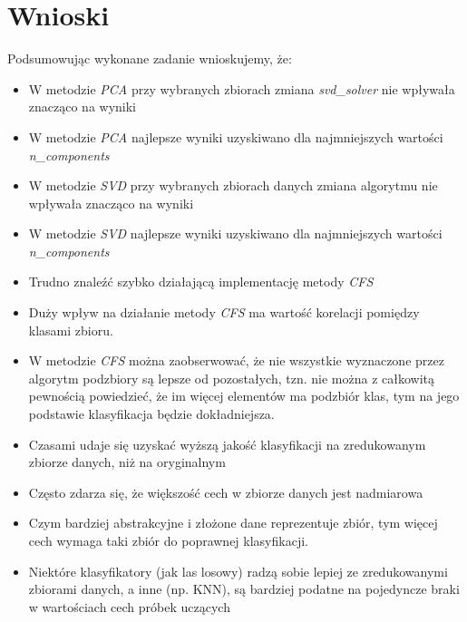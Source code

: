 \documentclass{classrep}
\begin{document}
    \section{Wnioski}
    \label{conclusions} {
        Podsumowując wykonane zadanie wnioskujemy, że:
        \begin{itemize}
            \item W metodzie \textit{PCA} przy wybranych zbiorach zmiana
            \textit{svd\_solver} nie wpływała znacząco na wyniki
            \item W metodzie \textit{PCA} najlepsze wyniki uzyskiwano dla najmniejszych
            wartości \textit{n\_components}
            \item W metodzie \textit{SVD} przy wybranych zbiorach danych zmiana
            algorytmu nie wpływała znacząco na wyniki
            \item W metodzie \textit{SVD} najlepsze wyniki uzyskiwano dla najmniejszych
            wartości \textit{n\_components}
            \item Trudno znaleźć szybko działającą implementację metody \textit{CFS}
            \item Duży wpływ na działanie metody \textit{CFS} ma wartość korelacji pomiędzy klasami zbioru.
            \item W metodzie \textit{CFS} można zaobserwować, że nie wszystkie wyznaczone przez algorytm podzbiory są lepsze od pozostałych, tzn. nie można z całkowitą pewnością powiedzieć, że im więcej elementów ma podzbiór klas, tym na jego podstawie klasyfikacja będzie dokładniejsza.
            \item Czasami udaje się uzyskać wyższą jakość klasyfikacji na zredukowanym zbiorze danych, niż na oryginalnym
            \item Często zdarza się, że większość cech w zbiorze danych jest nadmiarowa
            \item Czym bardziej abstrakcyjne i złożone dane reprezentuje zbiór, tym więcej cech wymaga taki zbiór do poprawnej klasyfikacji.
            \item Niektóre klasyfikatory (jak las losowy) radzą sobie lepiej ze zredukowanymi zbiorami danych, a inne (np. KNN), są bardziej podatne na pojedyncze braki w wartościach cech próbek uczących

        \end{itemize}
    }

    \begin{thebibliography}{0}
    \end{thebibliography}
\end{document}
